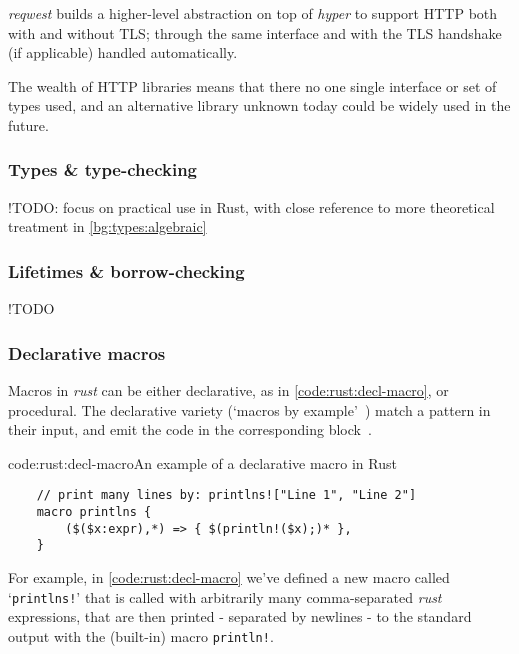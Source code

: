 \emph{reqwest} builds a higher-level abstraction on top of \emph{hyper} to support HTTP both with and without TLS; through the same interface and with the TLS handshake (if applicable) handled automatically.~\cite{reqwest}

The wealth of HTTP libraries means that there no one single interface or set of types used, and an alternative library unknown today could be widely used in the future.

\subsubsection{Types \& type-checking} \label{bg:rust:types}

!TODO: focus on practical use in Rust, with close reference to more theoretical treatment in \cref{bg:types:algebraic}

\subsubsection{Lifetimes \& borrow-checking} \label{bg:rust:borrows}

!TODO

\subsubsection{Declarative macros} \label{bg:rust:decl-macros}
Macros in \emph{rust} can be either declarative, as in \cref{code:rust:decl-macro}, or procedural. The declarative variety (`macros by example'~\cite{macro_by_example}) match a pattern in their input, and emit the code in the corresponding block~\cite{rust_macros_overview}.

\begin{codelisting}{code:rust:decl-macro}{An example of a declarative macro in Rust}
\begin{spacing}{\codespacing}
\begin{verbatim}
	// print many lines by: printlns!["Line 1", "Line 2"]
	macro printlns {
		($($x:expr),*) => { $(println!($x);)* },
	}
\end{verbatim}
\end{spacing}
\end{codelisting}

For example, in \cref{code:rust:decl-macro} we've defined a new macro called `\texttt{printlns!}' that is called with arbitrarily many comma-separated \emph{rust} expressions, that are then printed - separated by newlines - to the standard output with the (built-in) macro \texttt{println!}. \cite{rust_rfc1584}

